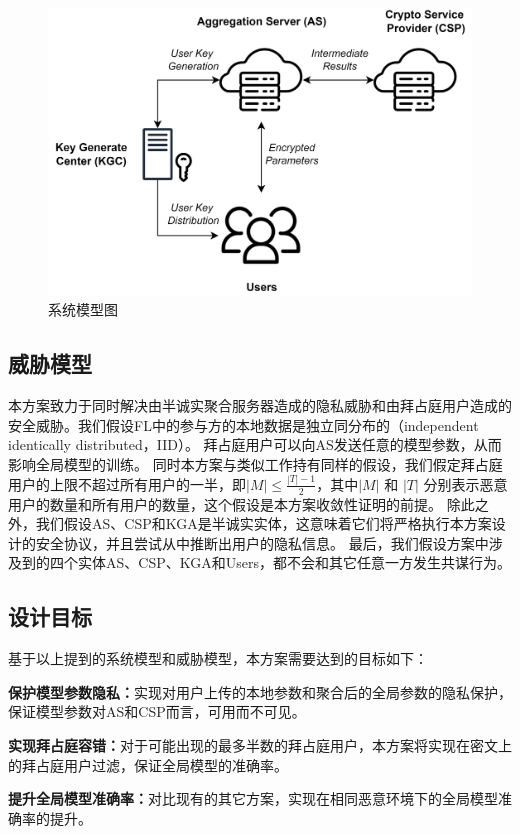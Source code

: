 \begin{figure}[htbp]
	\begin{center}
		\includegraphics[scale=0.077]{img/sys-v3.drawio.png}
		\caption{系统模型图}
		\label{syspnd}
	\end{center}
\end{figure}

\subsection{威胁模型}
本方案致力于同时解决由半诚实聚合服务器造成的隐私威胁和由拜占庭用户造成的安全威胁。我们假设FL中的参与方的本地数据是独立同分布的（independent identically distributed，IID）。
拜占庭用户可以向AS发送任意的模型参数，从而影响全局模型的训练。
同时本方案与类似工作\cite{so2020byzantine, yin2018byzantine, liu2021privacy}持有同样的假设，我们假定拜占庭用户的上限不超过所有用户的一半，即$|M|\leq\frac{|T|-1}{2}$，其中$|M|$ 和 $|T|$ 分别表示恶意用户的数量和所有用户的数量，这个假设是本方案收敛性证明的前提。
除此之外，我们假设AS、CSP和KGA是半诚实实体，这意味着它们将严格执行本方案设计的安全协议，并且尝试从中推断出用户的隐私信息。
最后，我们假设方案中涉及到的四个实体AS、CSP、KGA和Users，都不会和其它任意一方发生共谋行为。

\subsection{设计目标}
基于以上提到的系统模型和威胁模型，本方案需要达到的目标如下：
\begin{compactitem}
	\item \textbf{保护模型参数隐私：}实现对用户上传的本地参数和聚合后的全局参数的隐私保护，保证模型参数对AS和CSP而言，可用而不可见。
	\item \textbf{实现拜占庭容错：}对于可能出现的最多半数的拜占庭用户，本方案将实现在密文上的拜占庭用户过滤，保证全局模型的准确率。
	\item \textbf{提升全局模型准确率：}对比现有的其它方案，实现在相同恶意环境下的全局模型准确率的提升。
\end{compactitem}

